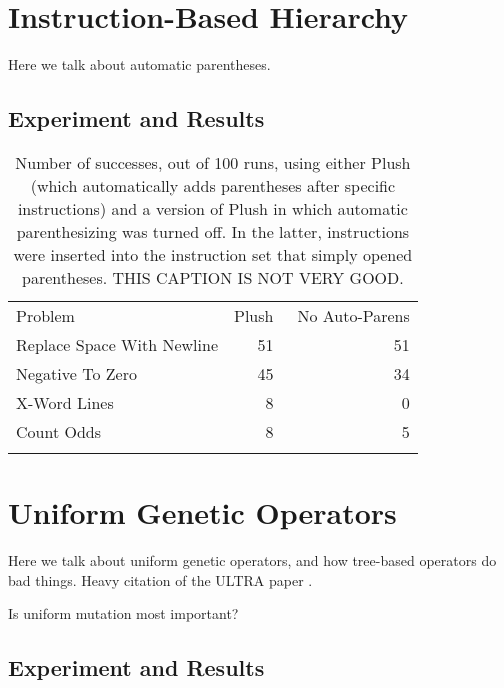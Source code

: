 \section{Instruction-Based Hierarchy}

Here we talk about automatic parentheses.


\subsection{Experiment and Results}


\begin{table}
\centering
\caption{Number of successes, out of 100 runs, using either Plush (which automatically adds parentheses after specific instructions) and a version of Plush in which automatic parenthesizing was turned off. In the latter, instructions were inserted into the instruction set that simply opened parentheses. THIS CAPTION IS NOT VERY GOOD.}
\label{no-auto-parens-experiment}       %
%
%
\begin{tabular}{l r r}
\hline\noalign{\smallskip}
Problem                    & Plush & ~No Auto-Parens \\
\noalign{\smallskip}\svhline\noalign{\smallskip}
Replace Space With Newline &  51 & 51 \\
Negative To Zero           &  45 & 34 \\
X-Word Lines               &   8 &  0 \\
Count Odds                 &   8 &  5 \\
\noalign{\smallskip}\hline\noalign{\smallskip}
\end{tabular}
\end{table}

\section{Uniform Genetic Operators}

Here we talk about uniform genetic operators, and how tree-based operators do bad things. Heavy citation of the ULTRA paper \citep{Spector:2013:GPTP}.

Is uniform mutation most important?


\subsection{Experiment and Results}



